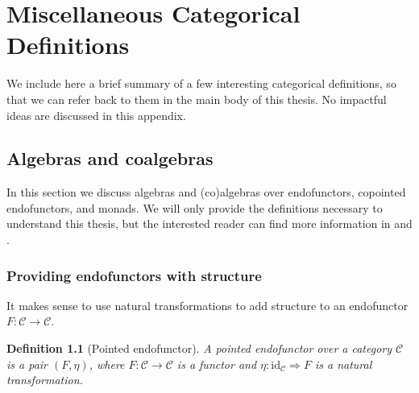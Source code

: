 \documentclass[12pt,a4paper,openright,twoside]{report}
\theoremstyle{plain}
\newtheorem{definition}[proposition]{Definition}
\theoremstyle{definition}
\begin{document}


{\footnotesize }



\clearpage{\pagestyle{empty}\cleardoublepage}




\appendix
\chapter{Miscellaneous Categorical Definitions}


We include here a brief summary of a few interesting categorical definitions, so that we can refer back to them in the main body of this thesis. No impactful ideas are discussed in this appendix.



\section{Algebras and coalgebras}
\label{sec: algebras}

In this section we discuss algebras and (co)algebras over endofunctors, copointed endofunctors, and monads. We will only provide the definitions necessary to understand this thesis, but the interested reader can find more information in \cite{jacobs1997tutorial} and \cite{wisbauer2008algebras}.


\subsection{Providing endofunctors with structure}

It makes sense to use natural transformations to add structure to an endofunctor $F: \mathcal{C} \to \mathcal{C}$.

\begin{definition}[Pointed endofunctor]
  \label{def: pointend}
  A pointed endofunctor over a category $\mathcal{C}$ is a pair $(F, \eta)$, where $F: \mathcal{C} \to \mathcal{C}$ is a functor and $\eta: \mathrm{id}_{\mathcal{C}} \Rightarrow F$ is a natural transformation. 
\end{definition}
\end{document}
